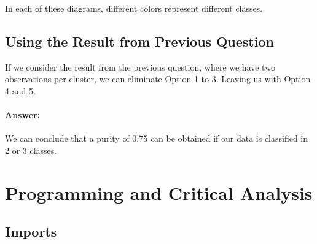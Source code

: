 \documentclass{article}
\begin{document}
\begin{center}
\end{center}

In each of these diagrams, different colors represent different classes.

\subsection*{Using the Result from Previous Question}

If we consider the result from the previous question, where we have two observations per cluster, we can eliminate 
Option 1 to 3. Leaving us with Option 4 and 5.


\paragraph{Answer:} We can conclude that a purity of 0.75 can be obtained if our data is classified in 2 or 3 classes.

\newpage

\section*{Programming and Critical Analysis}

\subsection*{Imports}
\end{document}
